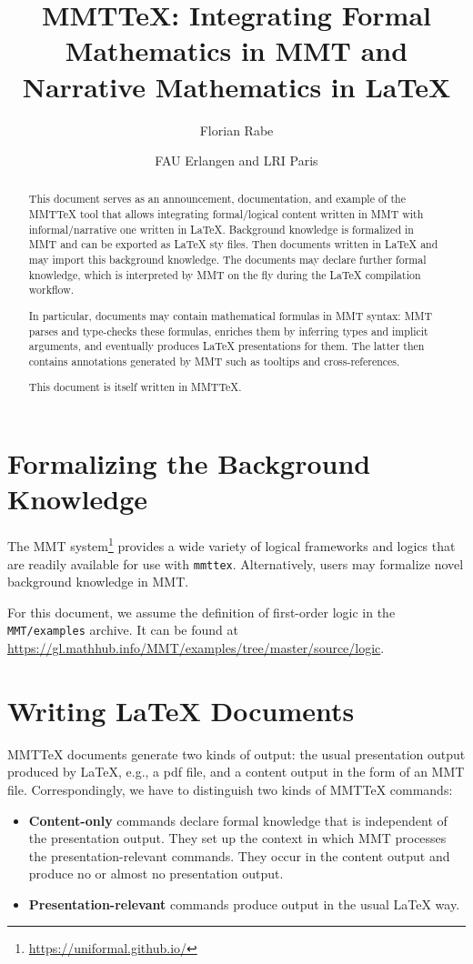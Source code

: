 \documentclass{article}
\begin{document}
\title{MMTTeX: Integrating Formal Mathematics in MMT and Narrative Mathematics in LaTeX}
\author{Florian Rabe}
\date{FAU Erlangen and LRI Paris}
\maketitle

\begin{abstract}
This document serves as an announcement, documentation, and example of the MMTTeX tool that allows integrating formal/logical content written in MMT with informal/narrative one written in LaTeX.
Background knowledge is formalized in MMT and can be exported as LaTeX sty files.
Then documents written in LaTeX and may import this background knowledge.
The documents may declare further formal knowledge, which is interpreted by MMT on the fly during the LaTeX compilation workflow.

In particular, documents may contain mathematical formulas in MMT syntax: MMT parses and type-checks these formulas, enriches them by inferring types and implicit arguments, and eventually produces LaTeX presentations for them.
The latter then contains annotations generated by MMT such as tooltips and cross-references.

This document is itself written in MMTTeX.
\end{abstract}

\section{Formalizing the Background Knowledge}

The MMT system\footnote{\url{https://uniformal.github.io/}} provides a wide variety of logical frameworks and logics that are readily available for use with \lstinline|mmttex|.
Alternatively, users may formalize novel background knowledge in MMT.

For this document, we assume the definition of first-order logic in the \lstinline|MMT/examples| archive.
It can be found at \url{https://gl.mathhub.info/MMT/examples/tree/master/source/logic}.

\section{Writing LaTeX Documents}

MMTTeX documents generate two kinds of output: the usual presentation output produced by LaTeX, e.g., a pdf file, and a content output in the form of an MMT file.
Correspondingly, we have to distinguish two kinds of MMTTeX commands:
\begin{itemize}
  \item \textbf{Content-only} commands declare formal knowledge that is independent of the presentation output.
  They set up the context in which MMT processes the presentation-relevant commands.
  They occur in the content output and produce no or almost no presentation output.
  \item \textbf{Presentation-relevant} commands produce output in the usual LaTeX way.
\end{itemize}
\end{document}
